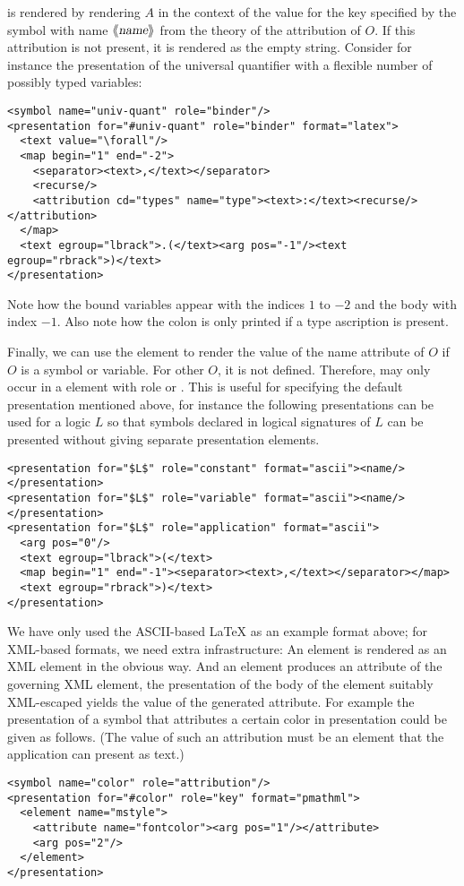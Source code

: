 {} is
rendered by rendering $A$ in the context of the value for the key specified by the symbol
with name $\langle\kern-.25em\langle\hbox{\sl{name}}\rangle\kern-.25em\rangle$ from the theory {} of the attribution of $O$. If
this attribution is not present, it is rendered as the empty string. Consider for instance
the presentation of the universal quantifier with a flexible number of possibly typed
variables:
\begin{lstlisting}[mathescape]
<symbol name="univ-quant" role="binder"/>
<presentation for="#univ-quant" role="binder" format="latex">
  <text value="\forall"/>
  <map begin="1" end="-2">
    <separator><text>,</text></separator>
    <recurse/>
    <attribution cd="types" name="type"><text>:</text><recurse/></attribution>
  </map>
  <text egroup="lbrack">.(</text><arg pos="-1"/><text egroup="rbrack">)</text>
</presentation>
\end{lstlisting}
Note how the bound variables appear with the indices $1$ to $-2$ and the body with index
$-1$. Also note how the colon is only printed if a type ascription is present.

  Finally, we can use the {} element to render the value of the name
  attribute of $O$ if $O$ is a symbol or variable. For other $O$, it is not defined.
  Therefore, {} may only occur in a {} element with
  role {} or {}.
  This is useful for specifying the default presentation mentioned above, for instance the
  following presentations can be used for a logic $L$ so that symbols declared in logical signatures of $L$ can be presented without giving separate presentation elements.
\begin{lstlisting}[mathescape]
<presentation for="$L$" role="constant" format="ascii"><name/></presentation>
<presentation for="$L$" role="variable" format="ascii"><name/></presentation>
<presentation for="$L$" role="application" format="ascii">
  <arg pos="0"/>
  <text egroup="lbrack">(</text>
  <map begin="1" end="-1"><separator><text>,</text></separator></map>
  <text egroup="rbrack">)</text>
</presentation>
\end{lstlisting}


We have only used the ASCII-based {\LaTeX} as an example format above; for XML-based
formats, we need extra infrastructure: An {} element is rendered as an
XML element in the obvious way. And an {} element produces an attribute
of the governing XML element, the presentation of the body of the element suitably
XML-escaped yields the value of the generated attribute. For example the presentation of a
symbol that attributes a certain color in presentation {\mathml} could be given as
follows. (The value of such an attribution must be an {} element that
the application can present as text.)
\begin{lstlisting}[mathescape]
<symbol name="color" role="attribution"/>
<presentation for="#color" role="key" format="pmathml">
  <element name="mstyle">
    <attribute name="fontcolor"><arg pos="1"/></attribute>
    <arg pos="2"/>
  </element>
</presentation>
\end{lstlisting}


